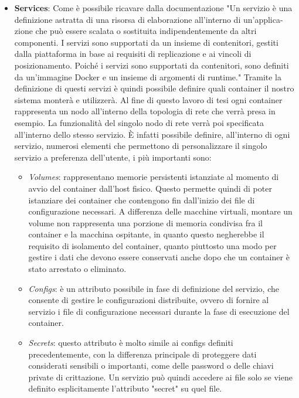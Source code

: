 \begin{itemize}
    \item \textbf{Services}: Come è possibile ricavare dalla documentazione\cite{composeservices} "Un servizio è una definizione astratta di una risorsa di elaborazione all'interno di un'applica-zione che può essere scalata o sostituita indipendentemente da altri componenti. 
    I servizi sono supportati da un insieme di contenitori, gestiti dalla piattaforma in base ai requisiti di replicazione e ai vincoli di posizionamento. Poiché i servizi sono supportati da contenitori, sono definiti da un'immagine Docker e un insieme di argomenti di runtime."
    Tramite la definizione di questi servizi è quindi possibile definire quali container il nostro sistema monterà e utilizzerà. Al fine di questo lavoro di tesi ogni container rappresenta un nodo all'interno della topologia di rete che verrà presa in esempio. La funzionalità del
    singolo nodo di rete verrà poi specificata all'interno dello stesso servizio. È infatti possibile definire, all'interno di ogni servizio, numerosi elementi che permettono di personalizzare il singolo servizio a preferenza dell'utente, i più importanti sono:\\

    \begin{itemize}
        \item \textit{Volumes}: rappresentano memorie persistenti istanziate al momento di avvio del container dall'host fisico. Questo permette quindi di poter istanziare dei container che contengono fin dall'inizio dei file di configurazione necessari. A differenza delle macchine virtuali, montare un volume
            non rappresenta una porzione di memoria condivisa fra il container e la macchina ospitante, in quanto questo negherebbe il requisito di isolamento del container, quanto piuttosto una modo per gestire i dati che devono essere conservati anche dopo che un container è stato arrestato o eliminato.
        \item \textit{Configs}: è un attributo possibile in fase di definizione del servizio, che consente di gestire le configurazioni distribuite, ovvero di fornire al servizio i file di configurazione necessari durante la fase di esecuzione del container.  
        \item \textit{Secrets}: questo attributo è molto simile ai configs definiti precedentemente, con la differenza principale di proteggere dati considerati sensibili o importanti, come delle password o delle chiavi private di crittazione. Un servizio può quindi accedere ai file solo se viene definito esplicitamente
            l'attributo "secret" su quel file.
    \end{itemize}


\end{itemize}
